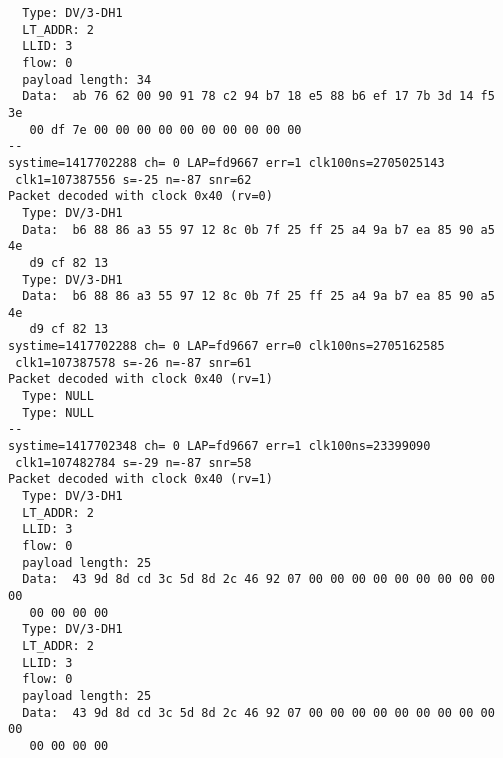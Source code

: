 \begin{verbatim}
  Type: DV/3-DH1
  LT_ADDR: 2
  LLID: 3
  flow: 0
  payload length: 34
  Data:  ab 76 62 00 90 91 78 c2 94 b7 18 e5 88 b6 ef 17 7b 3d 14 f5 3e
   00 df 7e 00 00 00 00 00 00 00 00 00 00
--
systime=1417702288 ch= 0 LAP=fd9667 err=1 clk100ns=2705025143
 clk1=107387556 s=-25 n=-87 snr=62
Packet decoded with clock 0x40 (rv=0)
  Type: DV/3-DH1
  Data:  b6 88 86 a3 55 97 12 8c 0b 7f 25 ff 25 a4 9a b7 ea 85 90 a5 4e
   d9 cf 82 13
  Type: DV/3-DH1
  Data:  b6 88 86 a3 55 97 12 8c 0b 7f 25 ff 25 a4 9a b7 ea 85 90 a5 4e
   d9 cf 82 13
systime=1417702288 ch= 0 LAP=fd9667 err=0 clk100ns=2705162585
 clk1=107387578 s=-26 n=-87 snr=61
Packet decoded with clock 0x40 (rv=1)
  Type: NULL
  Type: NULL
--
systime=1417702348 ch= 0 LAP=fd9667 err=1 clk100ns=23399090
 clk1=107482784 s=-29 n=-87 snr=58
Packet decoded with clock 0x40 (rv=1)
  Type: DV/3-DH1
  LT_ADDR: 2
  LLID: 3
  flow: 0
  payload length: 25
  Data:  43 9d 8d cd 3c 5d 8d 2c 46 92 07 00 00 00 00 00 00 00 00 00 00
   00 00 00 00
  Type: DV/3-DH1
  LT_ADDR: 2
  LLID: 3
  flow: 0
  payload length: 25
  Data:  43 9d 8d cd 3c 5d 8d 2c 46 92 07 00 00 00 00 00 00 00 00 00 00
   00 00 00 00
\end{verbatim}